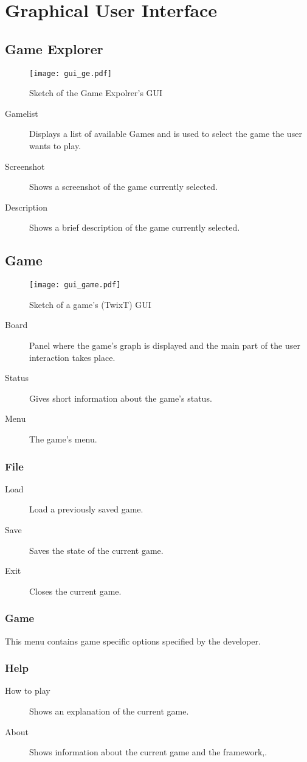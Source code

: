 \section{Graphical User Interface}
\subsection{Game Explorer}

\begin{figure}[h]
	\centering
	\texttt{[image: gui\_ge.pdf]}
	\caption{Sketch of the Game Expolrer's GUI}
	\label{img:GE_GUI}
\end{figure}

\begin{description}
	\item[Gamelist] Displays a list of available Games and is used to select the game the user wants to play.
	\item[Screenshot] Shows a screenshot of the game currently selected.
	\item[Description] Shows a brief description of the game currently selected.
\end{description}

\subsection{Game}

\begin{figure}[H]
	\centering
	\texttt{[image: gui\_game.pdf]}
	\caption{Sketch of a game's (TwixT) GUI}
	\label{img:GAME_GUI}
\end{figure}

\begin{description}
	\item[Board] Panel where the game's graph is displayed and the main part of the user interaction takes place.
	\item[Status] Gives short information about the game's status.
	\item[Menu] The game's menu.
\end{description}

\subsubsection{File}
\begin{description}
	\item[Load] Load a previously saved game.
	\item[Save] Saves the state of the current game.
	\item[Exit] Closes the current game.
\end{description}
\subsubsection{Game}
This menu contains game specific options specified by the developer.
\subsubsection{Help}
\begin{description}
	\item[How to play] Shows an explanation of the current game.
	\item[About] Shows information about the current game and the framework,.
\end{description}




